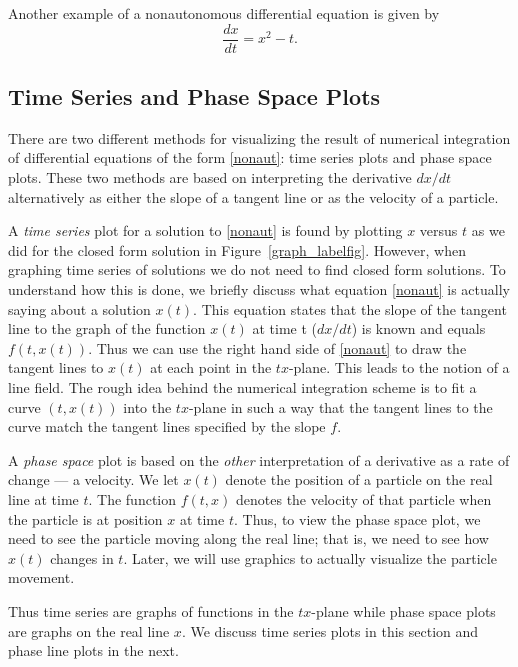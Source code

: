 \documentclass{ximera}
\begin{document}
Another example of a nonautonomous differential equation is given by
\begin{equation}  \label{dfeq}
\frac{dx}{dt} = x^2-t.
\end{equation}


\subsection*{Time Series and Phase Space Plots}

There are two different methods for visualizing the result of
numerical integration of differential equations of the form
\eqref{nonaut}: time series plots and phase space plots.  These
two methods are based on interpreting the derivative $dx/dt$
alternatively as either the slope of a tangent line or as the
velocity of a particle.

A {\em time series\/}  plot for a solution to
\eqref{nonaut} is found by plotting $x$ versus $t$ as we did for
the closed form solution in Figure~\ref{graph_labelfig}.  However,
when graphing time series of solutions we do not need to find closed
form solutions.  To understand how this is done, we briefly discuss
what equation \eqref{nonaut} is actually saying about a solution
$x(t)$.  This equation states that the slope of the tangent line
to the graph of the function $x(t)$ at time t ($dx/dt$) is known
and equals $f(t,x(t))$.  Thus we can use the right hand side of
\eqref{nonaut} to draw the tangent lines to $x(t)$ at each point
in the $tx$-plane.  This leads to the notion of a line field.
The rough idea behind the numerical integration scheme is to fit
a curve $(t,x(t))$ into the $tx$-plane in such a way that the
tangent lines to the curve match the tangent lines specified by
the slope $f$.

A {\em phase space\/}  plot is based on
the {\em other\/} interpretation of a derivative as a rate of
change --- a velocity.  We let $x(t)$ denote the position of a
particle on the real line at time $t$.  The function $f(t,x)$
denotes the velocity of that particle when the particle is at
position $x$ at time $t$.  Thus, to view the phase space plot,
we need to see the particle moving along the real line; that is,
we need to see how $x(t)$ changes in $t$.  Later, we will use
\Matlab graphics to actually visualize the particle movement.

Thus time series are graphs of functions in the $tx$-plane while
phase space plots are graphs on the real line $x$.  We discuss
time series plots in this section and phase line plots in the
next.
\end{document}
